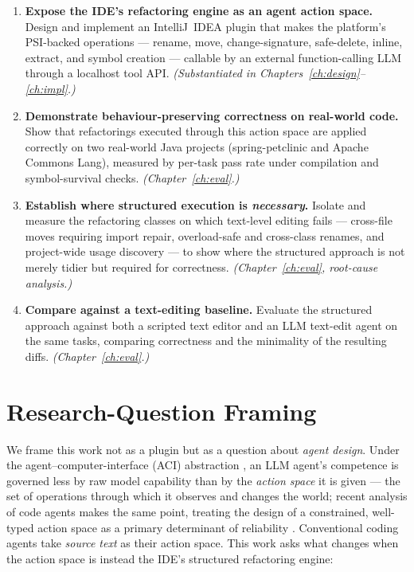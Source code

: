 \begin{enumerate}
  \item \textbf{Expose the IDE's refactoring engine as an agent action space.}
  Design and implement an IntelliJ~IDEA plugin that makes the platform's
  PSI-backed operations --- rename, move, change-signature, safe-delete, inline,
  extract, and symbol creation --- callable by an external function-calling LLM
  through a localhost tool API.
  \emph{(Substantiated in Chapters~\ref{ch:design}--\ref{ch:impl}.)}

  \item \textbf{Demonstrate behaviour-preserving correctness on real-world code.}
  Show that refactorings executed through this action space are applied
  correctly on two real-world Java projects (spring-petclinic and Apache Commons
  Lang), measured by per-task pass rate under compilation and symbol-survival
  checks. \emph{(Chapter~\ref{ch:eval}.)}

  \item \textbf{Establish where structured execution is \emph{necessary}.}
  Isolate and measure the refactoring classes on which text-level editing fails
  --- cross-file moves requiring import repair, overload-safe and cross-class
  renames, and project-wide usage discovery --- to show where the structured
  approach is not merely tidier but required for correctness.
  \emph{(Chapter~\ref{ch:eval}, root-cause analysis.)}

  \item \textbf{Compare against a text-editing baseline.}
  Evaluate the structured approach against both a scripted text editor and an LLM
  text-edit agent on the same tasks, comparing correctness and the minimality of
  the resulting diffs. \emph{(Chapter~\ref{ch:eval}.)}
\end{enumerate}

\section{Research-Question Framing}
\label{sec:intro-rqs}
We frame this work not as a plugin but as a question about \emph{agent design}.
Under the agent--computer-interface (ACI) abstraction \citep{sweagent2024}, an
LLM agent's competence is governed less by raw model capability than by the
\emph{action space} it is given --- the set of operations through which it
observes and changes the world; recent analysis of code agents makes the same
point, treating the design of a constrained, well-typed action space as a
primary determinant of reliability \citep{demystifying2025}. Conventional coding
agents take \emph{source text} as their action space. This work asks what
changes when the action space is instead the IDE's structured refactoring
engine:

